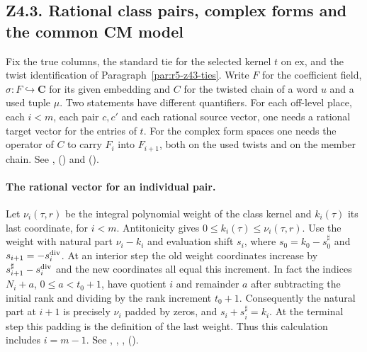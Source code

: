 \subsection*{Z4.3. Rational class pairs, complex forms and the common CM model}
\label{r6:Z4.3}
Fix the true columns, the standard tie for the selected kernel $t$ on
$\mathrm{ex}$, and the twist identification of
Paragraph~\ref{par:r5-z43-ties}. Write $F$ for the coefficient field,
$\sigma:F\hookrightarrow\mathbf C$ for its given embedding and $C$ for
the twisted chain of a word $u$ and a used tuple $\mu$. Two statements
have different quantifiers. For each off-level place, each $i<m$, each
pair $c,c'$ and each rational source vector, one needs a rational
target vector for the entries of $t$. For the complex form spaces one
needs the operator of $C$ to carry $F_i$ into $F_{i+1}$, both on the
used twists and on the member chain.
See ,  ()
and  ().

\paragraph{The rational vector for an individual pair.}
Let $\nu_i(\tau,r)$ be the integral polynomial weight of the class
kernel and $k_i(\tau)$ its last coordinate, for $i<m$.
Antitonicity gives $0\le k_i(\tau)\le\nu_i(\tau,r)$.
Use the weight with natural part $\nu_i-k_i$ and evaluation shift
$s_i$, where $s_0=k_0-s^\sharp_0$ and $s_{i+1}=-s^{\rm div}_i$.
At an interior step the old weight coordinates increase by
$s^\sharp_{i+1}-s^{\rm div}_i$ and the new coordinates all equal
this increment. In fact the indices $N_i+a$, $0\le a<t_0+1$,
have quotient $i$ and remainder $a$ after subtracting the initial
rank and dividing by the rank increment $t_0+1$. Consequently the
natural part at $i+1$ is precisely $\nu_i$ padded by zeros,
and $s_i+s^\sharp_i=k_i$. At the terminal step this padding is
the definition of the last weight. Thus this calculation includes
$i=m-1$. See , , ,
 ().

